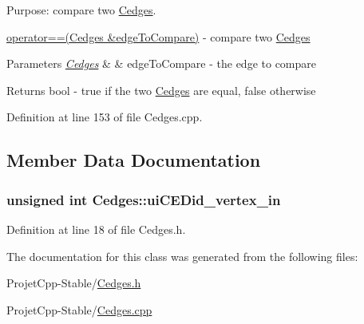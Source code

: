 Purpose\+: compare two \hyperlink{class_cedges}{Cedges}. 

\hyperlink{class_cedges_ab4fdab8847fe895c3975237624f1c870}{operator==(\+Cedges \&edge\+To\+Compare)} -\/ compare two \hyperlink{class_cedges}{Cedges}


\begin{DoxyParams}{Parameters}
{\em \hyperlink{class_cedges}{Cedges}} & \& edge\+To\+Compare -\/ the edge to compare\\
\hline
\end{DoxyParams}
\begin{DoxyReturn}{Returns}
bool -\/ true if the two \hyperlink{class_cedges}{Cedges} are equal, false otherwise 
\end{DoxyReturn}


Definition at line 153 of file Cedges.\+cpp.



\subsection{Member Data Documentation}
\hypertarget{class_cedges_ad9442a3d65633ebf622aa0623f61bfba}{}
\subsubsection[{ui\+C\+E\+Did\+\_\+vertex\+\_\+in}]{\setlength{\rightskip}{0pt plus 5cm}unsigned int Cedges\+::ui\+C\+E\+Did\+\_\+vertex\+\_\+in\hspace{0.3cm}{\ttfamily [private]}}\label{class_cedges_ad9442a3d65633ebf622aa0623f61bfba}


Definition at line 18 of file Cedges.\+h.



The documentation for this class was generated from the following files\+:\begin{DoxyCompactItemize}
\item 
Projet\+Cpp-\/\+Stable/\hyperlink{_cedges_8h}{Cedges.\+h}\item 
Projet\+Cpp-\/\+Stable/\hyperlink{_cedges_8cpp}{Cedges.\+cpp}\end{DoxyCompactItemize}
